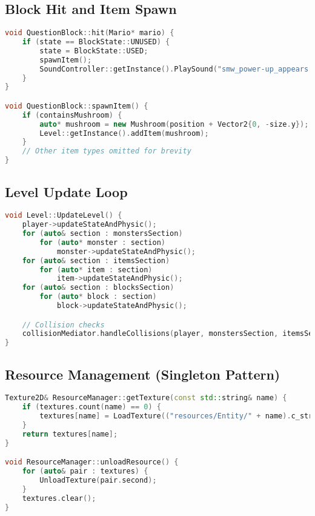 \subsection*{Block Hit and Item Spawn}
\begin{lstlisting}[language=C++, caption={Question Block Hit and Item Spawn}]
void QuestionBlock::hit(Mario* mario) {
    if (state == BlockState::UNUSED) {
        state = BlockState::USED;
        spawnItem();
        SoundController::getInstance().PlaySound("smw_power-up_appears.wav");
    }
}

void QuestionBlock::spawnItem() {
    if (containsMushroom) {
        auto* mushroom = new Mushroom(position + Vector2{0, -size.y});
        Level::getInstance().addItem(mushroom);
    }
    // Other item types omitted for brevity
}
\end{lstlisting}

\subsection*{Level Update Loop}
\begin{lstlisting}[language=C++, caption={Level Update and Collision Handling}]
void Level::UpdateLevel() {
    player->updateStateAndPhysic();
    for (auto& section : monstersSection)
        for (auto* monster : section)
            monster->updateStateAndPhysic();
    for (auto& section : itemsSection)
        for (auto* item : section)
            item->updateStateAndPhysic();
    for (auto& section : blocksSection)
        for (auto* block : section)
            block->updateStateAndPhysic();

    // Collision checks
    collisionMediator.handleCollisions(player, monstersSection, itemsSection, blocksSection);
}
\end{lstlisting}

\subsection*{Resource Management (Singleton Pattern)}
\begin{lstlisting}[language=C++, caption={ResourceManager Singleton Usage}]
Texture2D& ResourceManager::getTexture(const std::string& name) {
    if (textures.count(name) == 0) {
        textures[name] = LoadTexture(("resources/Entity/" + name).c_str());
    }
    return textures[name];
}

void ResourceManager::unloadResource() {
    for (auto& pair : textures) {
        UnloadTexture(pair.second);
    }
    textures.clear();
}
\end{lstlisting}